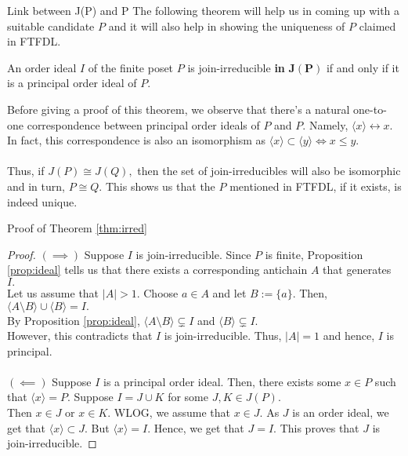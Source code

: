 \documentclass[handout, aspectratio=169]{beamer}
\begin{document}
\begin{frame}{Link between J(P) and P}
	The following theorem will help us in coming up with a suitable candidate $P$ and it will also help in showing the uniqueness of $P$ claimed in FTFDL.
	\begin{theorem}\label{thm:irred}
		An order ideal $I$ of the finite poset $P$ is join-irreducible \textbf{in} $\mathbf{J(P)}$ if and only if it is a principal order ideal of $P.$
	\end{theorem}
	Before giving a proof of this theorem, we observe that there's a natural one-to-one correspondence between principal order ideals of $P$ and $P.$ Namely, $\langle x\rangle \leftrightarrow x.$ In fact, this correspondence is also an isomorphism as $\langle x\rangle \subset \langle y\rangle \iff x \le y.$\\~\\
	Thus, if $J(P) \cong J(Q),$ then the set of join-irreducibles will also be isomorphic and in turn, $P \cong Q.$ This shows us that the $P$ mentioned in FTFDL, if it exists, is indeed unique.

\end{frame}
\begin{frame}{Proof of Theorem \ref{thm:irred}}
	
	\begin{proof}
		$(\implies)$ Suppose $I$ is join-irreducible. Since $P$ is finite, Proposition \ref{prop:ideal} tells us that there exists a corresponding antichain $A$ that generates $I.$\\
		Let us assume that $|A| > 1.$ Choose $a \in A$ and let $B := \{a\}.$ Then, $\langle A\setminus B\rangle\cup\langle B\rangle = I.$\\
		By Proposition \ref{prop:ideal}, $\langle A\setminus B\rangle \subsetneq I$ and $\langle B\rangle\subsetneq I.$ \\
		However, this contradicts that $I$ is join-irreducible. Thus, $|A| = 1$ and hence, $I$ is principal.\\~\\
		$(\impliedby)$ Suppose $I$ is a principal order ideal. Then, there exists some $x \in P$ such that $\langle x\rangle = P.$ Suppose $I = J \cup K$ for some $J, K \in J(P).$\\
		Then $x \in J$ or $x \in K.$ WLOG, we assume that $x \in J.$ As $J$ is an order ideal, we get that $\langle x\rangle \subset J.$ But $\langle x\rangle = I.$ Hence, we get that $J = I.$ This proves that $J$ is join-irreducible.
	\end{proof}
\end{frame}
\end{document}
